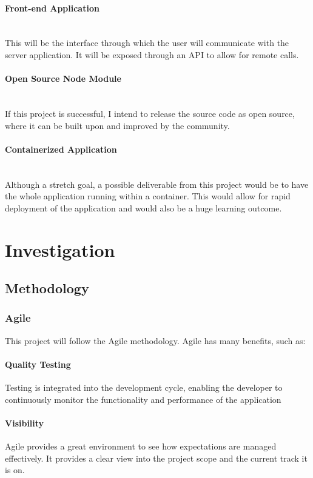 \documentclass{article}
\begin{document}
\paragraph{Front-end Application}\mbox{}\\
This will be the interface through which the user will communicate with the server application. It will be exposed through an API to allow for remote calls.

\paragraph{Open Source Node Module}\mbox{}\\
If this project is successful, I intend to release the source code as open source, where it can be built upon and improved by the community.

\paragraph{Containerized Application}\mbox{}\\
Although a stretch goal, a possible deliverable from this project would be to have the whole application running within a container. This would allow for rapid deployment of the application and would also be a huge learning outcome.


\section{Investigation}

\subsection{Methodology}

\subsubsection{Agile}
\label{subs:agile}
This project will follow the Agile methodology. Agile has many benefits, such as:

\paragraph{Quality Testing} Testing is integrated into the development cycle, enabling the developer to continuously monitor the functionality and performance of the application

\paragraph{Visibility} Agile provides a great environment to see how expectations are managed effectively. It provides a clear view into the project scope and the current track it is on.
\end{document}
